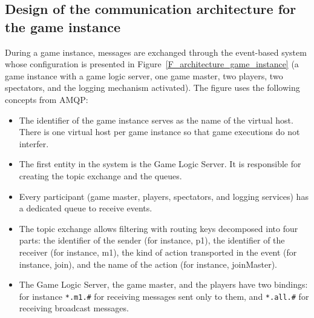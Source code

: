 \newpage

\subsection{Design of the communication architecture for the game instance}
\label{SS_integration_design}

During a game instance, messages are exchanged through the event-based
system whose configuration is presented in
Figure~\ref{F_architecture_game_instance} (a game instance with a game
logic server, one game master, two players, two spectators, and the
logging mechanism activated). The figure uses the following concepts
from AMQP:
\begin{itemize}
\item The identifier of the game instance serves as the name of the
  virtual host. There is one virtual host per game instance so that
  game executions do not interfer.
\item The first entity in the system is the \textsf{Game Logic
  Server}. It is responsible for creating the topic exchange and the
  queues.
\item Every participant (game master, players, spectators, and logging
  services) has a dedicated queue to receive events.
\item The topic exchange allows filtering with routing keys decomposed
  into four parts: the identifier of the sender (for instance,
  \textsf{p1}), the identifier of the receiver (for instance,
  \textsf{m1}), the kind of action transported in the
  event (for instance, \textsf{join}), and the name of the
  action (for instance, \textsf{joinMaster}).
\item The \textsf{Game Logic Server}, the game master, and the players
  have two bindings: for instance \texttt{*.m1.\#} for receiving
  messages sent only to them, and \texttt{*.all.\#} for receiving
  broadcast messages.
\end{itemize}

